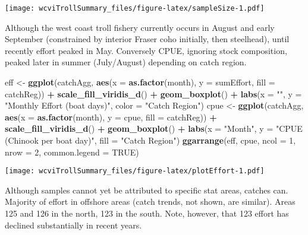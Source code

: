 \documentclass[]{article}
\newenvironment{Shaded}{\begin{snugshade}}{\end{snugshade}}
\newcommand{\DataTypeTok}[1]{\textcolor[rgb]{0.13,0.29,0.53}{#1}}
\newcommand{\DecValTok}[1]{\textcolor[rgb]{0.00,0.00,0.81}{#1}}
\newcommand{\KeywordTok}[1]{\textcolor[rgb]{0.13,0.29,0.53}{\textbf{#1}}}
\newcommand{\NormalTok}[1]{#1}
\newcommand{\OperatorTok}[1]{\textcolor[rgb]{0.81,0.36,0.00}{\textbf{#1}}}
\newcommand{\OtherTok}[1]{\textcolor[rgb]{0.56,0.35,0.01}{#1}}
\newcommand{\StringTok}[1]{\textcolor[rgb]{0.31,0.60,0.02}{#1}}
\begin{document}
\texttt{[image: wcviTrollSummary\_files/figure-latex/sampleSize-1.pdf]}

Although the west coast troll fishery currently occurs in August and
early September (constrained by interior Fraser coho initially, then
steelhead), until recently effort peaked in May. Conversely CPUE,
ignoring stock composition, peaked later in summer (July/August)
depending on catch region.

\begin{Shaded}
\begin{Highlighting}[]
\NormalTok{eff <-}\StringTok{ }\KeywordTok{ggplot}\NormalTok{(catchAgg, }\KeywordTok{aes}\NormalTok{(}\DataTypeTok{x =} \KeywordTok{as.factor}\NormalTok{(month), }\DataTypeTok{y =}\NormalTok{ sumEffort, }
                            \DataTypeTok{fill =}\NormalTok{ catchReg)) }\OperatorTok{+}
\StringTok{  }\KeywordTok{scale_fill_viridis_d}\NormalTok{() }\OperatorTok{+}
\StringTok{  }\KeywordTok{geom_boxplot}\NormalTok{() }\OperatorTok{+}
\StringTok{  }\KeywordTok{labs}\NormalTok{(}\DataTypeTok{x =} \StringTok{""}\NormalTok{, }\DataTypeTok{y =} \StringTok{"Monthly Effort (boat days)"}\NormalTok{, }\DataTypeTok{color =} \StringTok{"Catch Region"}\NormalTok{)}
\NormalTok{cpue <-}\StringTok{ }\KeywordTok{ggplot}\NormalTok{(catchAgg, }\KeywordTok{aes}\NormalTok{(}\DataTypeTok{x =} \KeywordTok{as.factor}\NormalTok{(month), }\DataTypeTok{y =}\NormalTok{ cpue, }
                             \DataTypeTok{fill =}\NormalTok{ catchReg)) }\OperatorTok{+}
\StringTok{  }\KeywordTok{scale_fill_viridis_d}\NormalTok{() }\OperatorTok{+}
\StringTok{  }\KeywordTok{geom_boxplot}\NormalTok{() }\OperatorTok{+}
\StringTok{  }\KeywordTok{labs}\NormalTok{(}\DataTypeTok{x =} \StringTok{"Month"}\NormalTok{, }\DataTypeTok{y =} \StringTok{"CPUE (Chinook per boat day)"}\NormalTok{, }\DataTypeTok{fill =} \StringTok{"Catch Region"}\NormalTok{)}
\KeywordTok{ggarrange}\NormalTok{(eff, cpue, }\DataTypeTok{ncol =} \DecValTok{1}\NormalTok{, }\DataTypeTok{nrow =} \DecValTok{2}\NormalTok{, }\DataTypeTok{common.legend =} \OtherTok{TRUE}\NormalTok{)}
\end{Highlighting}
\end{Shaded}

\texttt{[image: wcviTrollSummary\_files/figure-latex/plotEffort-1.pdf]}

Although samples cannot yet be attributed to specific stat areas,
catches can. Majority of effort in offshore areas (catch trends, not
shown, are similar). Areas 125 and 126 in the north, 123 in the south.
Note, however, that 123 effort has declined substantially in recent
years.
\end{document}
